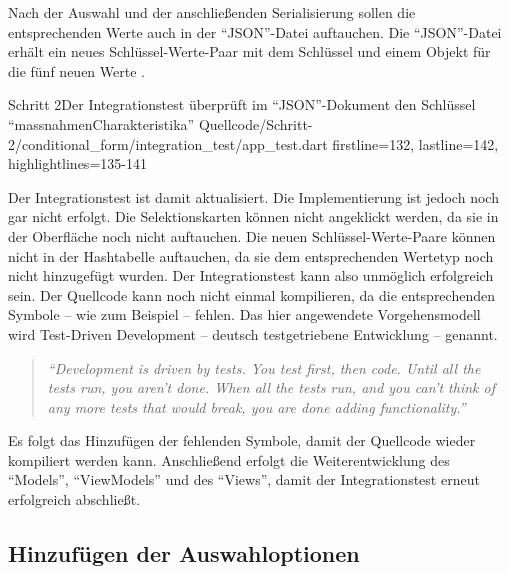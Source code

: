 Nach der Auswahl und der anschließenden Serialisierung sollen die entsprechenden Werte auch in der \enquote{JSON}-Datei auftauchen.
Die \enquote{JSON}-Datei erhält ein neues Schlüssel-Werte-Paar mit dem Schlüssel  und einem Objekt für die fünf neuen Werte .

\begin{alexlisting}{Schritt 2}{Der Integrationstest überprüft im \enquote{JSON}-Dokument den Schlüssel \enquote{massnahmenCharakteristika}}
  {Quellcode/Schritt-2/conditional_form/integration_test/app_test.dart}
  {firstline=132, lastline=142, highlightlines={135-141}}
  \label{lst:Schritt2ExpectedJson}
\end{alexlisting}

Der Integrationstest ist damit aktualisiert.
Die Implementierung ist jedoch noch gar nicht erfolgt.
Die Selektionskarten können nicht angeklickt werden, da sie in der Oberfläche noch nicht auftauchen.
Die neuen Schlüssel-Werte-Paare können nicht in der Hashtabelle auftauchen, da sie dem entsprechenden Wertetyp noch nicht hinzugefügt wurden.
Der Integrationstest kann also unmöglich erfolgreich sein.
Der Quellcode kann noch nicht einmal kompilieren, da die entsprechenden Symbole -- wie zum Beispiel  -- fehlen.
Das hier angewendete Vorgehensmodell wird Test-Driven Development -- deutsch testgetriebene Entwicklung -- genannt.
 


\begin{quotation}
\textit{\enquote{Development is driven by tests.
You test first, then code.
Until all the tests run, you aren't
done.
When all the tests run, and you can't think of any more tests that would break, you
are done adding functionality.}}


\end{quotation}

Es folgt das Hinzufügen der fehlenden Symbole, damit der Quellcode wieder kompiliert werden kann.
Anschließend erfolgt die Weiterentwicklung des \enquote{Models}, \enquote{ViewModels} und des \enquote{Views}, damit der Integrationstest erneut erfolgreich abschließt.


\subsection{Hinzufügen der Auswahloptionen}

